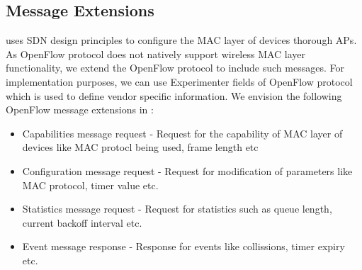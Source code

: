 \subsection{Message Extensions}
\label{sec:messages}
  		  
\pmac uses SDN design principles to configure the MAC layer of devices thorough APs. As OpenFlow protocol does not natively support wireless MAC layer functionality, we extend the OpenFlow protocol to include such messages. For implementation purposes, we can use Experimenter fields of OpenFlow protocol which is used to define vendor specific information. We envision the following OpenFlow message extensions in \pmac:
\begin{itemize}
\item Capabilities message request - Request for the capability of MAC layer of devices like MAC protocl being used, frame length etc
\item Configuration message request - Request for modification of parameters like MAC protocol, timer value etc.
\item Statistics message request - Request for statistics such as queue length, current backoff interval etc.
\item Event message response - Response for events like collissions, timer expiry etc.
\end {itemize}
